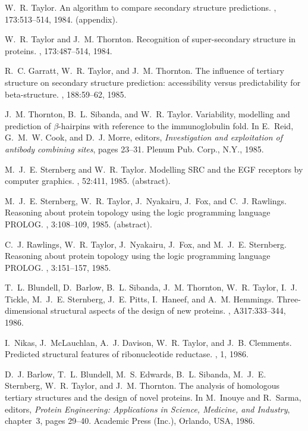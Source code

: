 \begin{thebibliography}{100}
W.~R. Taylor.
\newblock An algorithm to compare secondary structure predictions.
, 173:513--514, 1984.
\newblock (appendix).

W.~R. Taylor and J.~M. Thornton.
\newblock Recognition of super-secondary structure in proteins.
, 173:487--514, 1984.

R.~C. Garratt, W.~R. Taylor, and J.~M. Thornton.
\newblock The influence of tertiary structure on secondary structure
  prediction: accessibility versus predictability for beta-structure.
, 188:59--62, 1985.

J.~M. Thornton, B.~L. Sibanda, and W.~R. Taylor.
\newblock Variability, modelling and prediction of $\beta$-hairpins with
  reference to the immunoglobulin fold.
\newblock In E.~Reid, G.~M.~W. Cook, and D.~J. Morre, editors, {\em
  Investigation and exploitation of antibody combining sites}, pages 23--31.
  Plenum Pub. Corp., N.Y., 1985.

M.~J.~E. Sternberg and W.~R. Taylor.
\newblock Modelling {SRC} and the {EGF} receptors by computer graphics.
, 52:411, 1985.
\newblock (abstract).

M.~J.~E. Sternberg, W.~R. Taylor, J.~Nyakairu, J.~Fox, and C.~J. Rawlings.
\newblock Reasoning about protein topology using the logic programming language
  {PROLOG}.
, 3:108--109, 1985.
\newblock (abstract).

C.~J. Rawlings, W.~R. Taylor, J.~Nyakairu, J.~Fox, and M.~J.~E. Sternberg.
\newblock Reasoning about protein topology using the logic programming language
  {PROLOG}.
, 3:151--157, 1985.

T.~L. Blundell, D.~Barlow, B.~L. Sibanda, J.~M. Thornton, W.~R. Taylor, I.~J.
  Tickle, M.~J.~E. Sternberg, J.~E. Pitts, I.~Haneef, and A.~M. Hemmings.
\newblock Three-dimensional structural aspects of the design of new proteins.
, A317:333--344, 1986.

I.~Nikas, J.~McLauchlan, A.~J. Davison, W.~R. Taylor, and J.~B. Clemments.
\newblock Predicted structural features of ribonucleotide reductase.
, 1, 1986.

D.~J. Barlow, T.~L. Blundell, M.~S. Edwards, B.~L. Sibanda, M.~J.~E. Sternberg,
  W.~R. Taylor, and J.~M. Thornton.
\newblock The analysis of homologous tertiary structures and the design of
  novel proteins.
\newblock In M.~Inouye and R.~Sarma, editors, {\em Protein Engineering:
  Applications in Science, Medicine, and Industry}, chapter~3, pages 29--40.
  Academic Press (Inc.), Orlando, USA, 1986.


\end{thebibliography}
